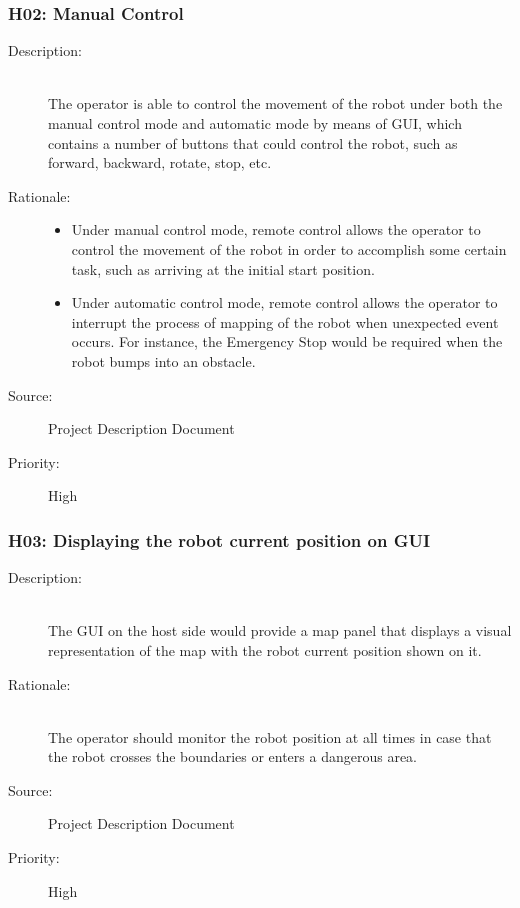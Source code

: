 \documentclass[titlepage]{article}
\begin{document}
\subsubsection{H02: Manual Control }
\begin{description}
\item[Description: ] \hfill \\ The operator is able to control the movement of the robot under both the manual control mode and automatic mode by means of GUI, which contains a number of buttons that could control the robot, such as forward, backward, rotate, stop, etc.
\item[Rationale: ] \hfill 
\begin{itemize}
\item Under manual control mode, remote control allows the operator to control the movement of the robot in order to accomplish some certain task, such as arriving at the initial start position. 
\item Under automatic control mode, remote control allows the operator to interrupt the process of mapping of the robot when unexpected event occurs. For instance, the Emergency Stop would be required when the robot bumps into an obstacle.
\end{itemize}
\item[Source: ] Project Description Document
\item[Priority: ] High
\end{description}


\subsubsection{H03: Displaying the robot current position on GUI }
\begin{description}
\item[Description: ] \hfill \\The GUI on the host side would provide a map panel that displays a visual representation of the map with the robot current position shown on it.
\item[Rationale: ] \hfill \\ The operator should monitor the robot position at all times in case that the robot crosses the boundaries or enters a dangerous area.
\item[Source: ] Project Description Document
\item[Priority: ] High
\end{description}
\end{document}
